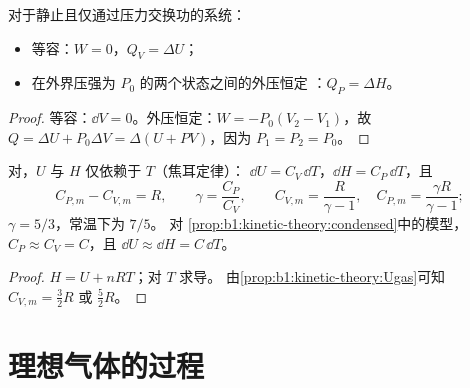 \begin{proposition}[定容热与定压热]\label{prop:b1:first-law:qvqp}
对于静止且仅通过压力交换功的系统：
\begin{itemize}
  \item 等容：$W = 0$，$Q_V = \Delta U$；
  \item 在外界压强为 $P_0$ 的两个状态之间的外压恒定
        ：$Q_P = \Delta H$。
\end{itemize}
\end{proposition}

\begin{proof}
等容：$\dd V = 0$。外压恒定：$W = -P_0(V_2 - V_1)$，故 $Q = \Delta U +
P_0\Delta V = \Delta(U + PV)$，因为 $P_1 = P_2 = P_0$。
\end{proof}

\begin{proposition}\label{prop:b1:first-law:gas}
对，$U$ 与 $H$ 仅依赖于 $T$（焦耳定律）：
$\dd U = C_V\,\dd T$，$\dd H = C_P\,\dd T$，且
\[
C_{P,m} - C_{V,m} = R, \qquad \gamma = \frac{C_P}{C_V}, \qquad
C_{V,m} = \frac{R}{\gamma - 1}, \quad C_{P,m} = \frac{\gamma R}{\gamma - 1} ;
\]
 $\gamma = 5/3$，常温下为 $7/5$。
对
\cref{prop:b1:kinetic-theory:condensed}中的模型，$C_P \approx C_V = C$，且
$\dd U \approx \dd H = C\,\dd T$。
\end{proposition}

\begin{proof}
$H = U + nRT$；对 $T$ 求导。
由\cref{prop:b1:kinetic-theory:Ugas}可知 $C_{V,m} = \tfrac32 R$ 或 $\tfrac52 R$。
\end{proof}

\section{理想气体的过程}

